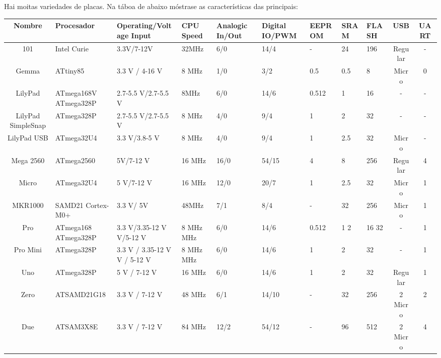 \documentclass[11pt,twoside]{book}
\begin{document}
Hai moitas variedades de placas. Na táboa de abaixo móstrase as características das principais:

\begin{table}[htb]
\begin{center}
\resizebox{16cm}{!} {
\begin{tabular}{|c|m{3cm}|m{3.5cm}|m{2cm}|m{2cm}|m{2cm}|m{2cm}|m{2cm}|m{2cm}|c|c|}
\hline
Nombre & Procesador & Operating/Voltage Input & CPU Speed & Analogic In/Out & Digital IO/PWM & EEPROM & SRAM & FLASH & USB & UART \\
\hline
101 & Intel Curie & 3.3V/7-12V & 32MHz & 6/0 & 14/4 & - & 24 & 196 & Regular & - \\ 
\hline
Gemma & ATtiny85 & 3.3 V / 4-16 V & 8 MHz & 1/0 & 3/2 & 0.5 & 0.5 & 8 & Micro & 0 \\
\hline
LilyPad & ATmega168V \newline ATmega328P & 2.7-5.5 V/2.7-5.5 V & 8MHz & 6/0 & 14/6 & 0.512 & 1 & 16 & - & - \\
\hline
LilyPad SimpleSnap & ATmega328P & 2.7-5.5 V/2.7-5.5 V & 8 MHz & 4/0 & 9/4 & 1 & 2 & 32 & - & - \\
\hline
LilyPad USB & ATmega32U4 & 3.3 V/3.8-5 V & 8 MHz & 4/0 & 9/4 & 1 & 2.5 & 32 & Micro & - \\
\hline
Mega 2560 & ATmega2560 & 5V/7-12 V & 16 MHz & 16/0 & 54/15 & 4 & 8 & 256 & Regular & 4 \\
\hline
Micro & ATmega32U4 & 5 V/7-12 V & 16 MHz & 12/0 & 20/7 & 1 & 2.5 & 32 & Micro & 1 \\
\hline
MKR1000 & SAMD21 Cortex-M0+ & 3.3 V/ 5V  & 48MHz  & 7/1 & 8/4 & - & 32 & 256 & Micro & 1 \\
\hline
Pro & ATmega168 ATmega328P & 3.3 V/3.35-12 V \newline  5 V/5-12 V & 8 MHz  \newline  16 MHz & 6/0 & 14/6 & 0.512 \newline 1 & 1   2 & 16  32 & - & 1 \\
\hline
Pro Mini & ATmega328P & 3.3 V / 3.35-12 V \newline  5 V / 5-12 V & 8 MHz \newline  16 MHz & 6/0 & 14/6 & 1 & 2 & 32 & - & 1 \\
\hline
Uno & ATmega328P & 5 V / 7-12 V & 16 MHz & 6/0 & 14/6 & 1 & 2 & 32 & Regular & 1 \\
\hline
Zero & ATSAMD21G18 & 3.3 V / 7-12 V & 48 MHz & 6/1 & 14/10 & - & 32 & 256 & 2 Micro & 2 \\
\hline
Due & ATSAM3X8E & 3.3 V / 7-12 V & 84 MHz & 12/2 & 54/12 & - & 96 & 512 & 2 Micro & 4\\

\end{tabular}}
\end{center}
\end{table}
\end{document}

